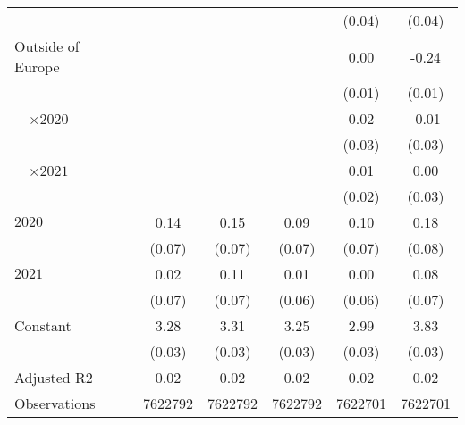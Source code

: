 \begin{tabular}{@{}l*{5}{S[table-format={-}2.2{\tnote{***}}]}@{}}
 &  &  &  & (0.04) & (0.04)\tabularnewline%
Outside of Europe &  &  &  & 0.00 & -0.24\tnote{***}\tabularnewline%
 &  &  &  & (0.01) & (0.01)\tabularnewline%
~~\(\times 2020\) &  &  &  & 0.02 & -0.01\tabularnewline%
 &  &  &  & (0.03) & (0.03)\tabularnewline%
~~\(\times 2021\) &  &  &  & 0.01 & 0.00\tabularnewline%
 &  &  &  & (0.02) & (0.03)\tabularnewline%
\midrule
\(2020\) & 0.14\tnote{*} & 0.15\tnote{*} & 0.09 & 0.10 & 0.18\tnote{*}\tabularnewline%
 & (0.07) & (0.07) & (0.07) & (0.07) & (0.08)\tabularnewline%
\(2021\) & 0.02 & 0.11 & 0.01 & 0.00 & 0.08\tabularnewline%
 & (0.07) & (0.07) & (0.06) & (0.06) & (0.07)\tabularnewline%
Constant & 3.28\tnote{***} & 3.31\tnote{***} & 3.25\tnote{***} & 2.99\tnote{***} & 3.83\tnote{***}\tabularnewline%
 & (0.03) & (0.03) & (0.03) & (0.03) & (0.03)\tabularnewline%
\midrule
Adjusted R2 & 0.02 & 0.02 & 0.02 & 0.02 & 0.02\tabularnewline%
Observations & {\num{7622792}} & {\num{7622792}} & {\num{7622792}} & {\num{7622701}} & {\num{7622701}}\tabularnewline%
\bottomrule
\end{tabular}
